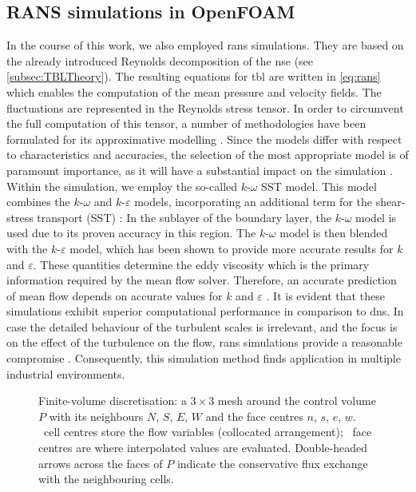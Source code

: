 \subsection{RANS simulations in OpenFOAM}\label{sec:RANSmethod}

In the course of this work, we also employed \acrshort{rans} simulations.
They are based on the already introduced Reynolds decomposition of the \acrshort{nse} (see \autoref{subsec:TBLTheory}).
The resulting equations for \acrshort{tbl} are written in \autoref{eq:rans} which enables the computation of the mean pressure and velocity fields.
The fluctuations are represented in the Reynolds stress tensor. 
In order to circumvent the full computation of this tensor, a number of methodologies have been formulated for its approximative modelling \citep{wilcox_turbulence_2006}. 
Since the models differ with respect to characteristics and accuracies, the selection of the most appropriate model is of paramount importance, as it will have a substantial impact on the simulation \citep{yang_assessment_2016}.
Within the simulation, we employ the so-called $k\text{-}\omega$ SST model.
This model combines the $k\text{-}\omega$ and $k\text{-}\varepsilon$ models, incorporating an additional term for the shear-stress transport (SST) \citep{menter_two-equation_1994}:
In the sublayer of the boundary layer, the $k\text{-}\omega$ model is used due to its proven accuracy in this region. 
The $k\text{-}\omega$ model is then blended with the $k\text{-}\varepsilon$ model, which has been shown to provide more accurate results for $k$ and $\varepsilon$.
These quantities determine the eddy viscosity which is the primary information required by the mean flow solver. 
Therefore, an accurate prediction of mean flow depends on accurate values for $k$ and $\varepsilon$ \citep{menter_two-equation_1994}.
It is evident that these simulations exhibit superior computational  performance in comparison to \acrshort{dns}.
In case the detailed behaviour of the turbulent scales is irrelevant, and the focus is on the effect of the turbulence on the flow, \acrshort{rans} simulations provide a reasonable compromise \citep{alfonsi_reynolds-averaged_2009}.
Consequently, this simulation method finds application in multiple industrial environments.


\begin{figure}[H]
    \centering
    
    \caption[Finite-volume stencil]{%
    Finite-volume discretisation: a $3\times3$  mesh
    around the control volume $P$ with its neighbours $N$, $S$, $E$, $W$ and
    the face centres $n$, $s$, $e$, $w$.
    \centermark~cell centres store the flow variables (collocated arrangement);
    \facemark~face centres are where interpolated values are evaluated.
    Double-headed arrows across the faces of $P$ indicate the conservative flux
    exchange with the neighbouring cells.}
    \label{fig:FVMMethod}
\end{figure}

